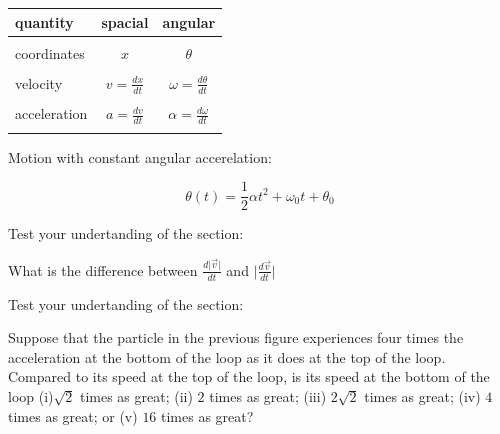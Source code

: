 \documentclass[]{beamer}
\begin{document}



 \begin{frame}

    \begin{center}
        \begin{tabular}{| l |c |c |}
            \hline
         quantity & spacial & angular \\ 
         \hline
          &  &  \\ 
          coordinates & $x$ & $\theta$ \\  
          &  &  \\ 
         velocity & $v=\frac{d x}{d t}$ & $\omega=\frac{d \theta}{d t}$  \\
         &  &  \\ 
         acceleration & $a=\frac{d v}{d t}$ & $\alpha=\frac{d \omega}{d t}$  \\
         &  &  \\ 
         \hline
        \end{tabular}
        \end{center}


        Motion with constant angular accerelation:

        \begin{equation}
\theta(t)=\frac{1}{2}\alpha t^2+\omega_0 t+\theta_0
        \end{equation}


        \end{frame}
    



     \begin{frame}
  Test your undertanding of the section:

  \vspace{7mm}
  What is the difference between $\frac{d\vert \vec v \vert}{d t}$ and $\vert\frac{d \vec v }{d t}\vert$
        
        
        
            \end{frame}
        



    \begin{frame}
        Test your undertanding of the section:
        \vspace{7mm}

        Suppose that the particle in the previous figure experiences four times the 
        acceleration at the bottom of the loop as it  does at the top of the loop. 
        Compared to its speed at the top of the loop, is its
        speed at the bottom of the loop (i)$\sqrt{2}$ times as great; (ii) $2$ times as great; 
        (iii) $2\sqrt{2}$ times as great; (iv) $4$ times as great; or (v) $16$ times as great?           
              
              
\end{frame}
              
\end{document}
